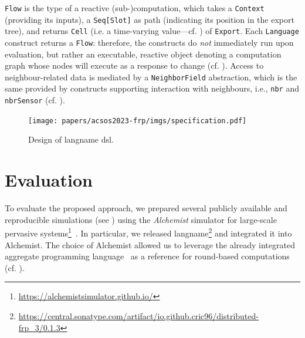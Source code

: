 \texttt{Flow} is the type 
 of a reactive \mbox{(sub-)computation},
 which takes a \texttt{Context} (providing its inputs),
 a \texttt{Seq[Slot]} as path (indicating its position in the export tree),
 and returns \texttt{Cell} (i.e. a time-varying value---cf. ) of \texttt{Export}.
%
Each \texttt{Language} construct
 returns a \texttt{Flow}:
 therefore, the constructs do \emph{not} immediately run upon evaluation,
 but rather an executable, reactive object
 denoting a computation graph
 whose nodes will execute as a response to change (cf. ).
%
Access to neighbour-related data is mediated by a \texttt{NeighborField} abstraction,
 which is the same provided by constructs
 supporting interaction with neighbours, i.e., \texttt{nbr} and \texttt{nbrSensor}
(cf. ).

\begin{figure}
\texttt{[image: papers/acsos2023-frp/imgs/specification.pdf]}
\caption{Design of \ac{langname} \ac{dsl}.}
\label{acsos2023-frp:fig:dsl-design}
\end{figure}

\section{Evaluation}
\label{acsos2023-frp:sec:eval}

%

To evaluate the proposed approach, 
 we prepared several publicly available and reproducible simulations
(see ) using the \emph{Alchemist} simulator for large-scale pervasive systems\footnote{\url{https://alchemistsimulator.github.io/}}~\cite{PianiniJOS2013}.
%
In particular, 
 we released \ac{langname}\footnote{\url{https://central.sonatype.com/artifact/io.github.cric96/distributed-frp_3/0.1.3}} and integrated it into Alchemist.
%
The choice of Alchemist allowed us to leverage the already integrated \emph{\scafi{}} aggregate programming language~\cite{DBLP:journals/softx/CasadeiVAP22}
as a reference for round-based computations (cf. ).

